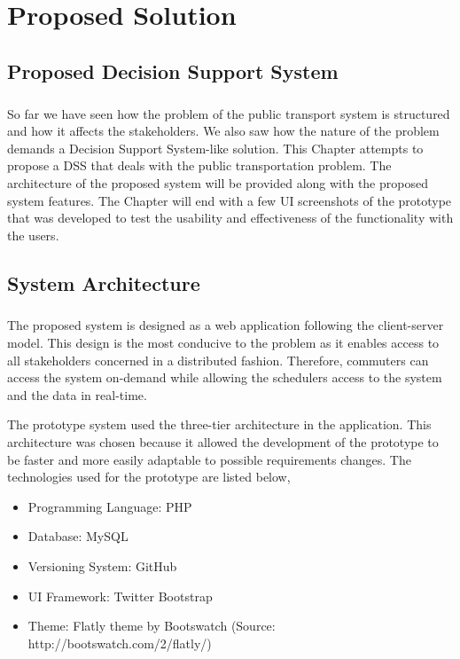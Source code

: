 
\chapter {Proposed Solution}
\label{chapter-ProposedSolution}

\section *{Proposed Decision Support System}

\paragraph {} So far we have seen how the problem of the public transport system is structured and how it affects the stakeholders. We also saw how the nature of the problem demands a Decision Support System-like solution. This Chapter attempts to propose a DSS that deals with the public transportation problem. The architecture of the proposed system will be provided along with the proposed system features. The Chapter will end with a few UI screenshots of the prototype that was developed to test the usability and effectiveness of the functionality with the users.

\section{System Architecture}

\paragraph{ } The proposed system is designed as a web application following the client-server model. This design is the most conducive to the problem as it enables access to all stakeholders concerned in a distributed fashion. Therefore, commuters can access the system on-demand while allowing the schedulers access to the system and the data in real-time.

The prototype system used the three-tier architecture in the application. This architecture was chosen because it allowed the development of the prototype to be faster and more easily adaptable to possible requirements changes. The technologies used for the prototype are listed below,

\begin {itemize}
\item Programming Language: PHP
\item Database: MySQL
\item Versioning System: GitHub
\item UI Framework: Twitter Bootstrap
\item Theme: Flatly theme by Bootswatch (Source: http://bootswatch.com/2/flatly/)
\end {itemize}

